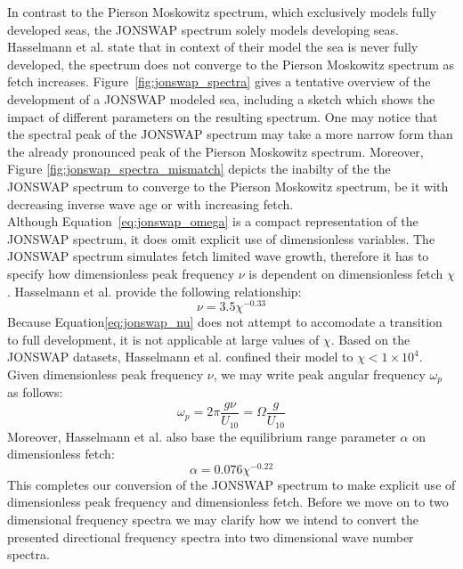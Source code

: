 In contrast to the Pierson Moskowitz spectrum, which exclusively models fully 
developed seas, the JONSWAP spectrum solely models developing seas. Hasselmann 
et al. state that in context of their model the sea is never fully developed, 
the spectrum does not converge to the Pierson Moskowitz spectrum as fetch 
increases. Figure~\ref{fig:jonswap_spectra} gives a tentative overview of the 
development of a JONSWAP modeled sea, including a sketch which shows the impact 
of different parameters on the resulting spectrum. One may notice that the 
spectral peak of the JONSWAP spectrum may take a more narrow form than the 
already pronounced peak of the Pierson Moskowitz spectrum. Moreover, Figure 
\ref{fig:jonswap_spectra_mismatch} depicts the inabilty of the the JONSWAP 
spectrum to converge to the Pierson Moskowitz spectrum, be it with decreasing 
inverse wave age or with increasing fetch.\\

Although Equation~\ref{eq:jonswap_omega} is a compact representation of the
JONSWAP spectrum, it does omit explicit use of dimensionless variables.
The JONSWAP spectrum simulates fetch limited wave growth, therefore it has to
specify how dimensionless peak frequency $\nu$ is dependent on dimensionless
fetch $\chi$. Hasselmann et al. provide the following relationship:
\begin{equation}
\label{eq:jonswap_nu}
 \nu = 3.5\chi^{-0.33}
\end{equation}
Because Equation\ref{eq:jonswap_nu} does not attempt to accomodate a transition 
to full development, it is not applicable at large values of $\chi$. Based on 
the JONSWAP datasets, Hasselmann et al. confined their model to $\chi < 
1\times10^4$. Given dimensionless peak frequency $\nu$, we may write peak 
angular frequency $\omega_p$ as follows:
\begin{equation}
 \omega_p = 2\pi\frac{g\nu}{U_{10}} = \Omega\frac{g}{U_{10}}
\end{equation}
Moreover, Hasselmann et al. also base the equilibrium range parameter $\alpha$ 
on dimensionless fetch:
\begin{equation}
 \alpha = 0.076 \chi^{-0.22}
\end{equation}
%
This completes our conversion of the JONSWAP spectrum to make explicit use of 
dimensionless peak frequency and dimensionless fetch. Before we move on to 
two dimensional frequency spectra we may clarify how we intend to convert the 
presented directional frequency spectra into two dimensional wave number
spectra.
%
